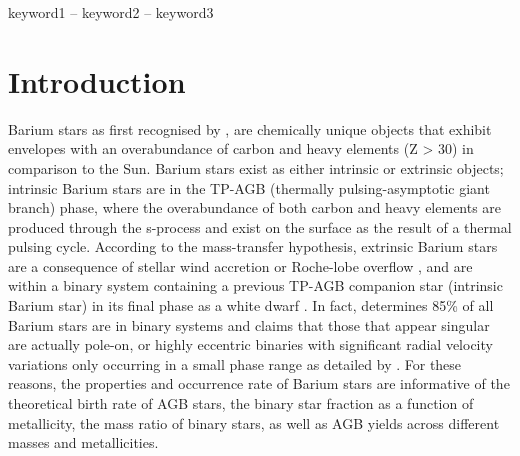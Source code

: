 \documentclass[a4paper,fleqn,usenatbib]{mnras}
\begin{document}
\begin{keywords}
keyword1 -- keyword2 -- keyword3
\end{keywords}

\section{Introduction} \label{sec:intro}

Barium stars as first recognised by \citet{Bidelman1951}, are chemically unique objects that exhibit envelopes with an overabundance of carbon and heavy elements (Z > 30) in comparison to the Sun. Barium stars exist as either intrinsic or extrinsic objects; intrinsic Barium stars are in the TP-AGB (thermally pulsing-asymptotic giant branch) phase, where the overabundance of both carbon and heavy elements are produced through the s-process and exist on the surface as the result of a thermal pulsing cycle. According to the mass-transfer hypothesis, extrinsic Barium stars are a consequence of stellar wind accretion \citep{boffin1988,jorissen1992} or Roche-lobe overflow \citep{webbink1986}, and are within a binary system containing a previous TP-AGB companion star (intrinsic Barium star) in its final phase as a white dwarf \citep{bohm1980,bohm1984}. In fact, \citet{mcclure1983} determines 85\% of all Barium stars are in binary systems and claims that those that appear singular are actually pole-on, or highly eccentric binaries with significant radial velocity variations only occurring in a small phase range as detailed by \citet{pourbaix2004}. For these reasons, the properties and occurrence rate of Barium stars are informative of the theoretical birth rate of AGB stars, the binary star fraction as a function of metallicity, the mass ratio of binary stars, as well as AGB yields across different masses and metallicities. 
\end{document}
